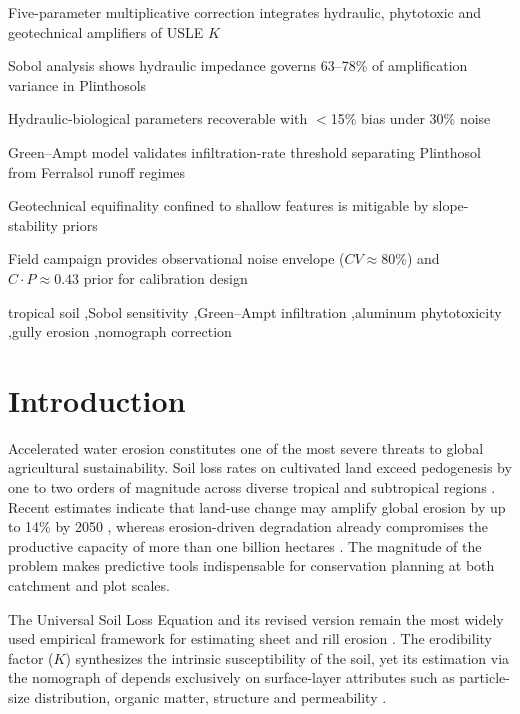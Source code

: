 \documentclass[preprint,review,12pt,authoryear]{elsarticle}
\begin{document}
\begin{frontmatter}
\begin{highlights}
\item Five-parameter multiplicative correction integrates hydraulic, phytotoxic and geotechnical amplifiers of USLE $K$
\item Sobol analysis shows hydraulic impedance governs 63--78\% of amplification variance in Plinthosols
\item Hydraulic-biological parameters recoverable with $<$15\% bias under 30\% noise
\item Green--Ampt model validates infiltration-rate threshold separating Plinthosol from Ferralsol runoff regimes
\item Geotechnical equifinality confined to shallow features is mitigable by slope-stability priors
\item Field campaign provides observational noise envelope ($CV \approx 80\%$) and $C \cdot P \approx 0.43$ prior for calibration design
\end{highlights}

\begin{keyword}
tropical soil \sep Sobol sensitivity \sep Green--Ampt infiltration \sep aluminum phytotoxicity \sep gully erosion \sep nomograph correction
\end{keyword}

\end{frontmatter}

\linenumbers

\section{Introduction}
\label{sec:intro}

Accelerated water erosion constitutes one of the most severe threats to global agricultural sustainability. Soil loss rates on cultivated land exceed pedogenesis by one to two orders of magnitude across diverse tropical and subtropical regions \citep{montgomery_2007}. Recent estimates indicate that land-use change may amplify global erosion by up to 14\% by 2050 \citep{borrelli_et_al_2017}, whereas erosion-driven degradation already compromises the productive capacity of more than one billion hectares \citep{lal_2001}. The magnitude of the problem makes predictive tools indispensable for conservation planning at both catchment and plot scales.

The Universal Soil Loss Equation and its revised version \citep{wischmeier_smith_1978,renard_et_al_1997} remain the most widely used empirical framework for estimating sheet and rill erosion \citep{alewell_et_al_2019}. The erodibility factor ($K$) synthesizes the intrinsic susceptibility of the soil, yet its estimation via the nomograph of \citet{wischmeier_et_al_1971} depends exclusively on surface-layer attributes such as particle-size distribution, organic matter, structure and permeability \citep{roemkens_et_al_1997}.
\end{document}
